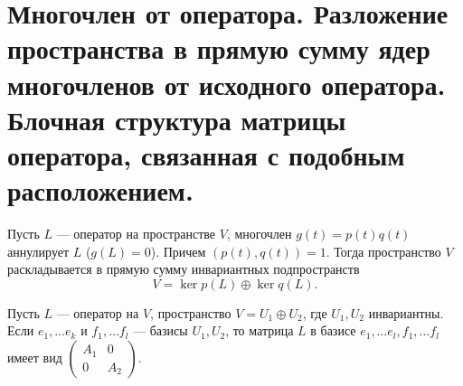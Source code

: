 \section{Многочлен от оператора. Разложение пространства в прямую сумму ядер многочленов от исходного оператора. Блочная структура матрицы оператора, связанная с подобным расположением.}
\begin{lm}
    Пусть $ L$ --- оператор на пространстве  $ V$,  многочлен  $ g(t) = p(t)q(t)$ аннулирует  $ L$ ($ g(L) = 0$). Причем $ \left( p(t), q(t) \right) =1$. Тогда пространство $ V$ раскладывается в прямую сумму инвариантных  подпространств
    \[
	V = \ker p(L) \oplus \ker q(L)
    .\] 
\end{lm}
\begin{st}
    Пусть $ L$ --- оператор на  $ V$, пространство  $V = U_1 \oplus U_2$, где $ U_1, U_2$ инвариантны. Если $ e_1, \ldots e_k$ и $ f_1, \ldots f_l$ --- базисы $ U_1, U_2$, то матрица $ L$ в базисе   $ e_1, \ldots e_l, f_1, \ldots f_l$ имеет вид $ 
    \begin{pmatrix}
	A_1& 0\\0&A_2
    \end{pmatrix}$.
\end{st}

